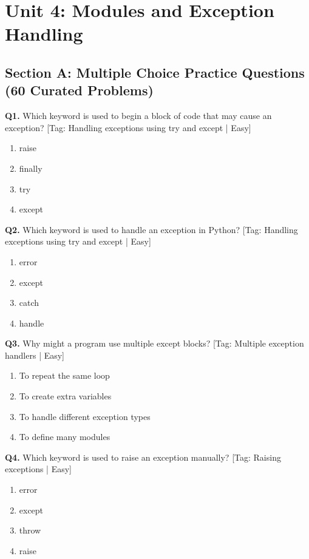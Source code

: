 \chapter{Unit 4: Modules and Exception Handling}

\section{Section A: Multiple Choice Practice Questions (60 Curated Problems)}

\noindent\textbf{Q1.} Which keyword is used to begin a block of code that may cause an exception? \hfill [Tag: Handling exceptions using try and except | Easy]
\begin{enumerate}[label=(\alph*),topsep=2pt,itemsep=1pt,partopsep=0pt,parsep=0pt]
    \item {raise}
    \item {finally}
    \item {try}
    \item {except}
\end{enumerate}
\vspace{2mm}
\noindent\textbf{Q2.} Which keyword is used to handle an exception in Python? \hfill [Tag: Handling exceptions using try and except | Easy]
\begin{enumerate}[label=(\alph*),topsep=2pt,itemsep=1pt,partopsep=0pt,parsep=0pt]
    \item {error}
    \item {except}
    \item {catch}
    \item {handle}
\end{enumerate}
\vspace{2mm}
\noindent\textbf{Q3.} Why might a program use multiple except blocks? \hfill [Tag: Multiple exception handlers | Easy]
\begin{enumerate}[label=(\alph*),topsep=2pt,itemsep=1pt,partopsep=0pt,parsep=0pt]
    \item {To repeat the same loop}
    \item {To create extra variables}
    \item {To handle different exception types}
    \item {To define many modules}
\end{enumerate}
\vspace{2mm}
\noindent\textbf{Q4.} Which keyword is used to raise an exception manually? \hfill [Tag: Raising exceptions | Easy]
\begin{enumerate}[label=(\alph*),topsep=2pt,itemsep=1pt,partopsep=0pt,parsep=0pt]
    \item {error}
    \item {except}
    \item {throw}
    \item {raise}
\end{enumerate}
